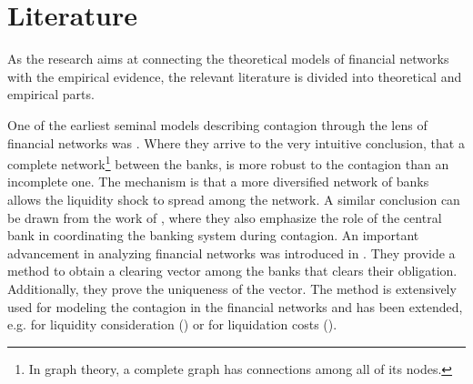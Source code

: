 \documentclass[12pt]{article}
\begin{document}
\section{Literature}\label{section:literature}

As the research aims at connecting the theoretical models of financial networks with the empirical evidence, the relevant literature is divided into theoretical and empirical parts.

One of the earliest seminal models describing contagion through the lens of financial networks was \cite{allen00}. Where they arrive to the very intuitive conclusion, that a complete network\footnote{In graph theory, a complete graph has connections among all of its nodes.} between the banks, is more robust to the contagion than an incomplete one. The mechanism is that a more diversified network of banks allows the liquidity shock to spread among the network. A similar conclusion can be drawn from the work of \cite{freixas00}, where they also emphasize the role of the central bank in coordinating the banking system during contagion. An important advancement in analyzing financial networks was introduced in \cite{eisenberg01}. They provide a method to obtain a clearing vector among the banks that clears their obligation. Additionally, they prove the uniqueness of the vector. The method is extensively used for modeling the contagion in the financial networks and has been extended, e.g. for liquidity consideration (\cite{cifuentes05}) or for liquidation costs (\cite{rogers13}). 
\end{document}

